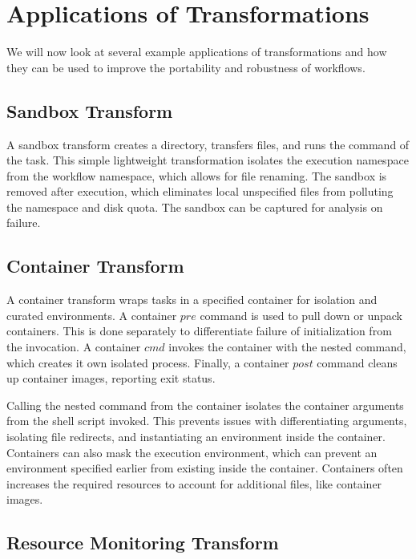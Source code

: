 \documentclass[conference]{IEEEtran}
\begin{document}
\section{Applications of Transformations}

We will now look at several example applications of
transformations and how they can be used to improve the portability and robustness of workflows.

\subsection{Sandbox Transform}

A sandbox transform creates a directory,
transfers files, and runs the command 
of the task.
This simple lightweight transformation isolates
the execution namespace from the workflow namespace,
which allows for file renaming.
The sandbox is removed after execution,
which eliminates local unspecified files from
polluting the namespace and disk quota.
The sandbox can be captured
for analysis on failure.

\subsection{Container Transform}

A container transform wraps tasks in a
specified container for isolation and
curated environments.
A container $pre$ command is used to pull down
or unpack containers.
This is done separately to 
differentiate failure of initialization
from the invocation.
A container $cmd$ invokes the container with the 
nested command, which creates it own isolated process.
Finally, a container $post$ command cleans
up container images, reporting exit status.

Calling the nested command from the container
isolates the container arguments from the shell
script invoked. This prevents issues with 
differentiating arguments, isolating file
redirects, and instantiating an environment
inside the container.
Containers can also mask the execution environment,
which can prevent an environment specified earlier from
existing inside the container. 
Containers often increases the required resources
to account for additional files,
like container images.

\subsection{Resource Monitoring Transform}
\end{document}
